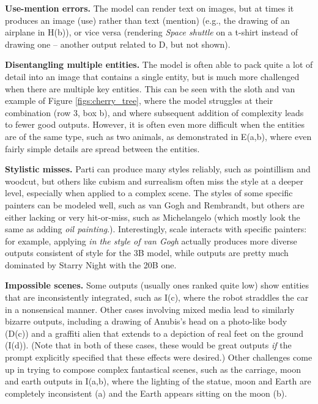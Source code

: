 \textbf{Use-mention errors.} The model can render text on images, but at times it produces an image (use) rather than text (mention) (e.g., the drawing of an airplane in H(b)), or vice versa (rendering \textit{Space shuttle} on a t-shirt instead of drawing one -- another output related to D, but not shown).

\textbf{Disentangling multiple entities.} The model is often able to pack quite a lot of detail into an image that contains a single entity, but is much more challenged when there are multiple key entities. This can be seen with the sloth and van example of  Figure \ref{figs:cherry_tree}, where the model struggles at their combination (row 3, box b), and where subsequent addition of complexity leads to fewer good outputs. However, it is often even more difficult when the entities are of the same type, such as two animals, as demonstrated in E(a,b), where even fairly simple details are spread between the entities.

\textbf{Stylistic misses.} Parti can produce many styles reliably, such as pointillism and woodcut, but others like cubism and surrealism often miss the style at a deeper level, especially when applied to a complex scene. The styles of some specific painters can be modeled well, such as van Gogh and Rembrandt, but others are either lacking or very hit-or-miss, such as Michelangelo (which mostly look the same as adding \textit{oil painting}.). Interestingly, scale interacts with specific painters: for example, applying \textit{in the style of van Gogh} actually produces more diverse outputs consistent of style for the 3B model, while outputs are pretty much dominated by Starry Night with the 20B one.

\textbf{Impossible scenes.} Some outputs (usually ones ranked quite low) show entities that are inconsistently integrated, such as I(c), where the robot straddles the car in a nonsensical manner. Other cases involving mixed media lead to similarly bizarre outputs, including a drawing of Anubis's head on a photo-like body (D(c))  and a graffiti alien that extends to a depiction of real feet on the ground (I(d)). (Note that in both of these cases, these would be great outputs \textit{if} the prompt explicitly specified that these effects were desired.) Other challenges come up in trying to compose complex fantastical scenes, such as the carriage, moon and earth outputs in I(a,b), where the lighting of the statue, moon and Earth are completely inconsistent (a) and the Earth appears sitting on the moon (b).

